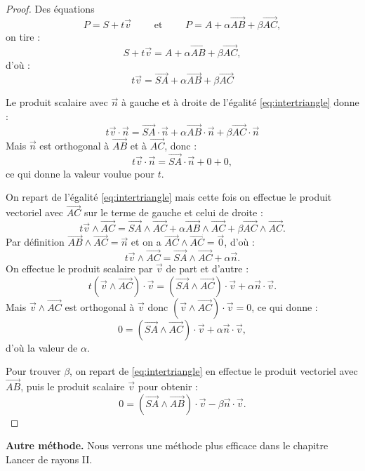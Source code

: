 \documentclass[11pt,class=report,crop=false]{standalone}
\begin{document}
\begin{proof}
Des équations 
$$P = S + t \vec v
\qquad \text{ et } \qquad P = A + \alpha \overrightarrow{AB} + \beta \overrightarrow{AC},$$
on tire :
$$S + t \vec v = A + \alpha \overrightarrow{AB} + \beta \overrightarrow{AC},$$
d'où :
\begin{equation}
\label{eq:intertriangle}
t \vec{v} = \overrightarrow{SA} + \alpha \overrightarrow{AB} + \beta \overrightarrow{AC}
\end{equation}

Le produit scalaire avec $\vec n$ à gauche et à droite de l'égalité \eqref{eq:intertriangle} donne :
$$t \vec{v} \cdot \vec{n} = \overrightarrow{SA} \cdot \vec{n} + \alpha \overrightarrow{AB} \cdot \vec{n} + \beta \overrightarrow{AC} \cdot \vec{n}$$
Mais $\vec n$ est orthogonal à $\overrightarrow{AB}$ et à $\overrightarrow{AC}$, donc :
$$t \vec{v} \cdot \vec{n} = \overrightarrow{SA} \cdot \vec{n} + 0 + 0,$$
ce qui donne la valeur voulue pour $t$.


On repart de l'égalité \eqref{eq:intertriangle} mais cette fois on effectue le produit vectoriel avec $\overrightarrow{AC}$ sur le terme de gauche et celui de droite :
$$t \vec{v} \wedge \overrightarrow{AC} = \overrightarrow{SA} \wedge \overrightarrow{AC}  + \alpha \overrightarrow{AB}  \wedge \overrightarrow{AC} + \beta \overrightarrow{AC} \wedge \overrightarrow{AC}.$$
Par définition $\overrightarrow{AB}  \wedge \overrightarrow{AC} = \vec n$ et on a $\overrightarrow{AC} \wedge \overrightarrow{AC} = \vec 0$, d'où :
$$t \vec{v} \wedge \overrightarrow{AC} = \overrightarrow{SA} \wedge \overrightarrow{AC}  + \alpha \vec{n}.$$
On effectue le produit scalaire par $\vec v$ de part et d'autre :
$$t (\vec{v} \wedge \overrightarrow{AC}) \cdot \vec{v} = (\overrightarrow{SA} \wedge \overrightarrow{AC}) \cdot \vec{v}  + \alpha \vec{n} \cdot \vec{v}.$$
Mais $\vec{v} \wedge \overrightarrow{AC}$ est orthogonal à $\vec{v}$ donc $(\vec{v} \wedge \overrightarrow{AC}) \cdot \vec{v} = 0$, ce qui donne :
$$0 = (\overrightarrow{SA} \wedge \overrightarrow{AC}) \cdot \vec{v}  + \alpha \vec{n} \cdot \vec{v},$$
d'où la valeur de $\alpha$.

Pour trouver $\beta$, on repart de \eqref{eq:intertriangle} en effectue le produit vectoriel avec $\overrightarrow{AB}$, puis le produit scalaire $\vec v$ pour obtenir :
$$0 = (\overrightarrow{SA} \wedge \overrightarrow{AB}) \cdot \vec{v}  - \beta \vec{n} \cdot \vec{v}.$$
\end{proof} 


\textbf{Autre méthode.} Nous verrons une méthode plus efficace dans le chapitre \og{}Lancer de rayons II\fg{}.
\end{document}
